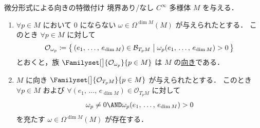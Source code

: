 \documentclass[geometry_main]{subfiles}
\begin{document}
\begin{myprop}[label=prop:orientation-form]{微分形式による向きの特徴付け}
    境界あり/なし $C^\infty$ 多様体 $M$ を与える．
    \begin{enumerate}
        \item $\forall p \in M$ において $0$ にならない $\omega \in \Omega^{\dim M}(M)$ が与えられたとする．
        このとき $\forall p \in M$ に対して
		\begin{align}
			\mathcal{O}_{\omega_p} \coloneqq \bigl\{\, (e_1,\, \dots,\, e_{\dim M}) \in \mathcal{B}_{T_p M} \bigm| \omega_p (e_1,\, \dots,\, e_{\dim M}) > 0 \,\bigr\} 
		\end{align}
		とおくと，族 $\Familyset[\big]{\mathcal{O}_{\omega_p}}{p \in M}$ は $M$ の\hyperref[def:smooth-orientation]{向き}である．
        \item $M$ に向き $\Familyset[\big]{\mathcal{O}_{T_p M}}{p \in M}$ が与えられたとする．
		このとき $\forall p \in M$ および $\forall (e_1,\, \dots,\, e_{\dim M}) \in \mathcal{O}_{T_ p M}$ に対して
        \begin{align}
			\omega_p \neq 0 \AND  \omega_p (e_1,\, \dots,\, e_{\dim M}) > 0
		\end{align}
		を充たす $\omega \in \Omega^{\dim M}(M)$ が存在する．
    \end{enumerate}
\end{myprop}
\end{document}
